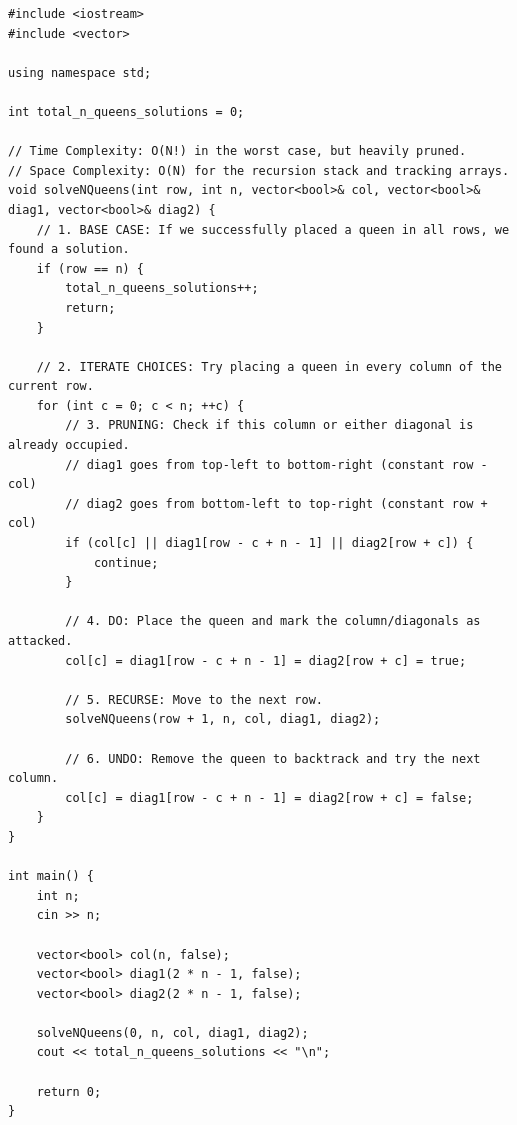 \begin{lstlisting}
#include <iostream>
#include <vector>

using namespace std;

int total_n_queens_solutions = 0;

// Time Complexity: O(N!) in the worst case, but heavily pruned.
// Space Complexity: O(N) for the recursion stack and tracking arrays.
void solveNQueens(int row, int n, vector<bool>& col, vector<bool>& diag1, vector<bool>& diag2) {
    // 1. BASE CASE: If we successfully placed a queen in all rows, we found a solution.
    if (row == n) {
        total_n_queens_solutions++;
        return;
    }
    
    // 2. ITERATE CHOICES: Try placing a queen in every column of the current row.
    for (int c = 0; c < n; ++c) {
        // 3. PRUNING: Check if this column or either diagonal is already occupied.
        // diag1 goes from top-left to bottom-right (constant row - col)
        // diag2 goes from bottom-left to top-right (constant row + col)
        if (col[c] || diag1[row - c + n - 1] || diag2[row + c]) {
            continue; 
        }

        // 4. DO: Place the queen and mark the column/diagonals as attacked.
        col[c] = diag1[row - c + n - 1] = diag2[row + c] = true;
        
        // 5. RECURSE: Move to the next row.
        solveNQueens(row + 1, n, col, diag1, diag2);
        
        // 6. UNDO: Remove the queen to backtrack and try the next column.
        col[c] = diag1[row - c + n - 1] = diag2[row + c] = false;
    }
}

int main() {
    int n;
    cin >> n;
    
    vector<bool> col(n, false);
    vector<bool> diag1(2 * n - 1, false);
    vector<bool> diag2(2 * n - 1, false);
    
    solveNQueens(0, n, col, diag1, diag2);
    cout << total_n_queens_solutions << "\n";
    
    return 0;
}
\end{lstlisting}